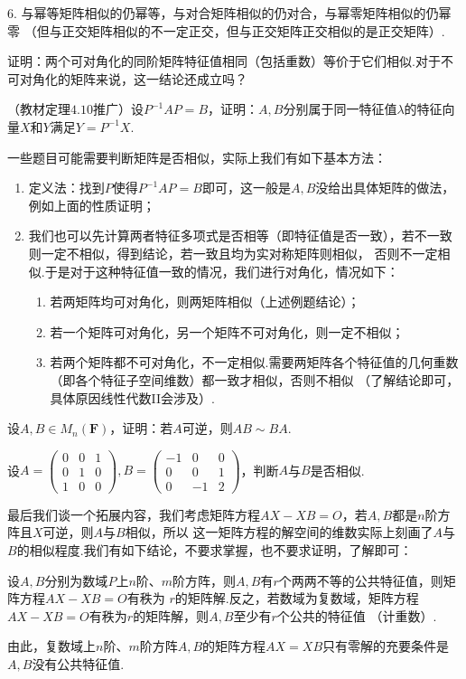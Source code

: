 6. 与幂等矩阵相似的仍幂等，与对合矩阵相似的仍对合，与幂零矩阵相似的仍幂零
（但与正交矩阵相似的不一定正交，但与正交矩阵正交相似的是正交矩阵）.
\begin{example}
	证明：两个可对角化的同阶矩阵特征值相同（包括重数）等价于它们相似.对于不可对角化的矩阵来说，这一结论还成立吗？
\end{example}
\begin{example}
	（教材定理$4.10$推广）设$P^{-1}AP=B$，证明：$A,B$分别属于同一特征值$\lambda$的特征向量$X$和$Y$满足$Y=P^{-1}X$.
\end{example}
一些题目可能需要判断矩阵是否相似，实际上我们有如下基本方法：
\begin{enumerate}
	\item 定义法：找到$P$使得$P^{-1}AP=B$即可，这一般是$A,B$没给出具体矩阵的做法，例如上面的性质证明；
	\item 我们也可以先计算两者特征多项式是否相等（即特征值是否一致），若不一致则一定不相似，得到结论，若一致且均为实对称矩阵则相似，
	否则不一定相似.于是对于这种特征值一致的情况，我们进行对角化，情况如下：
	\begin{enumerate}
		\item 若两矩阵均可对角化，则两矩阵相似（上述例题结论）；
		\item 若一个矩阵可对角化，另一个矩阵不可对角化，则一定不相似；
		\item 若两个矩阵都不可对角化，不一定相似.需要两矩阵各个特征值的几何重数（即各个特征子空间维数）都一致才相似，否则不相似
		（了解结论即可，具体原因线性代数II会涉及）.
	\end{enumerate}
\end{enumerate}
\begin{example}
	设$A,B\in M_n(\mathbf{F})$，证明：若$A$可逆，则$AB\sim BA$.
\end{example}
\begin{example}
	设$A=\begin{pmatrix}
		0 & 0 & 1 \\ 0 & 1 & 0 \\ 1 & 0 & 0
	\end{pmatrix},B=\begin{pmatrix}
		-1 & 0 & 0 \\ 0 & 0 & 1 \\ 0 & -1 & 2
	\end{pmatrix}$，判断$A$与$B$是否相似.
\end{example}
最后我们谈一个拓展内容，我们考虑矩阵方程$AX-XB=O$，若$A,B$都是$n$阶方阵且$X$可逆，则$A$与$B$相似，所以
这一矩阵方程的解空间的维数实际上刻画了$A$与$B$的相似程度.我们有如下结论，不要求掌握，也不要求证明，了解即可：
\begin{theorem}
	设$A,B$分别为数域$P$上$n$阶、$m$阶方阵，则$A,B$有$r$个两两不等的公共特征值，则矩阵方程$AX-XB=O$有秩为
	$r$的矩阵解.反之，若数域为复数域，矩阵方程$AX-XB=O$有秩为$r$的矩阵解，则$A,B$至少有$r$个公共的特征值
	（计重数）.
\end{theorem}
由此，复数域上$n$阶、$m$阶方阵$A,B$的矩阵方程$AX=XB$只有零解的充要条件是$A,B$没有公共特征值.

